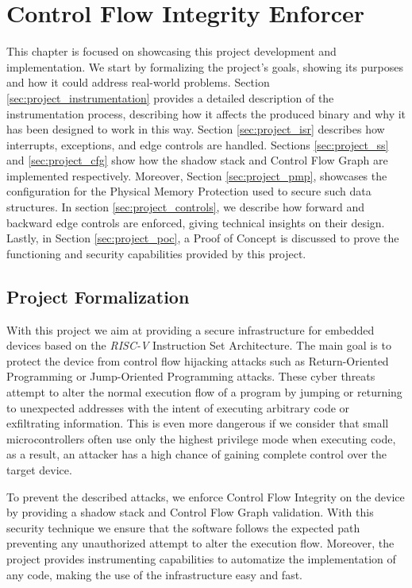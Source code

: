 \chapter{Control Flow Integrity Enforcer}
\label{cha:project}

This chapter is focused on showcasing this project development and
implementation. We start by formalizing the project's goals, showing its
purposes and how it could address real-world problems. Section \ref{sec:project_instrumentation}
provides a detailed description of the instrumentation process, describing how
it affects the produced binary and why it has been designed to work in this way.
Section \ref{sec:project_isr} describes how interrupts, exceptions, and edge controls
are handled. Sections \ref{sec:project_ss} and \ref{sec:project_cfg} show how
the shadow stack and Control Flow Graph are implemented respectively. Moreover,
Section \ref{sec:project_pmp}, showcases the configuration for the Physical Memory
Protection used to secure such data structures. In section
\ref{sec:project_controls}, we describe how forward and backward edge controls are
enforced, giving technical insights on their design. Lastly, in Section
\ref{sec:project_poc}, a Proof of Concept is discussed to prove the functioning and
security capabilities provided by this project.

\section{Project Formalization}
\label{sec:project_formalization}

With this project we aim at providing a secure infrastructure for embedded
devices based on the \textit{RISC-V} Instruction Set Architecture. The main goal
is to protect the device from control flow hijacking attacks such as Return-Oriented
Programming or Jump-Oriented Programming attacks. These cyber threats attempt to
alter the normal execution flow of a program by jumping or returning to unexpected
addresses with the intent of executing arbitrary code or exfiltrating information.
This is even more dangerous if we consider that small microcontrollers often use
only the highest privilege mode when executing code, as a result, an attacker
has a high chance of gaining complete control over the target device.

To prevent the described attacks, we enforce Control Flow Integrity on the device
by providing a shadow stack and Control Flow Graph validation. With this
security technique we ensure that the software follows the expected path
preventing any unauthorized attempt to alter the execution flow. Moreover, the
project provides instrumenting capabilities to automatize the implementation of
any code, making the use of the infrastructure easy and fast.

